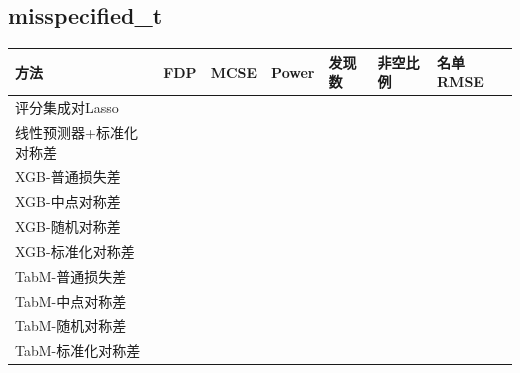 \documentclass[UTF8,11pt,a4paper]{ctexart}
\begin{document}
\subsection{misspecified\_t}\label{misspecified_t}

{\def\LTcaptype{none} %
{
\footnotesize
\begin{longtable}[]{@{}
  >{\raggedright\arraybackslash}p{}
  >{\raggedright\arraybackslash}p{}
  >{\raggedright\arraybackslash}p{}
  >{\raggedright\arraybackslash}p{}
  >{\raggedright\arraybackslash}p{}
  >{\raggedright\arraybackslash}p{}
  >{\raggedright\arraybackslash}p{}@{}}
\toprule\noalign{}
\begin{minipage}[b]{\linewidth}\raggedright
方法
\end{minipage} & \begin{minipage}[b]{\linewidth}\raggedright
FDP
\end{minipage} & \begin{minipage}[b]{\linewidth}\raggedright
MCSE
\end{minipage} & \begin{minipage}[b]{\linewidth}\raggedright
Power
\end{minipage} & \begin{minipage}[b]{\linewidth}\raggedright
发现数
\end{minipage} & \begin{minipage}[b]{\linewidth}\raggedright
非空比例
\end{minipage} & \begin{minipage}[b]{\linewidth}\raggedright
名单RMSE
\end{minipage} \\
\midrule\noalign{}
\endhead
\bottomrule\noalign{}
\endlastfoot
评分集成对Lasso & 0.1546 & 0.0286 & 0.0790 & 2.12 & 0.24 & 1.2047 \\
线性预测器+标准化对称差 & 0.0755 & 0.0208 & 0.0370 & 1.00 & 0.13 & 1.2168 \\
XGB-普通损失差 & 0.0968 & 0.0152 & 0.5060 & 6.36 & 0.69 & 1.0530 \\
XGB-中点对称差 & 0.1382 & 0.0167 & 0.5090 & 6.80 & 0.70 & 1.0509 \\
XGB-随机对称差 & 0.1163 & 0.0154 & 0.4990 & 6.42 & 0.68 & 1.0497 \\
XGB-标准化对称差 & 0.1419 & 0.0189 & 0.3660 & 5.35 & 0.57 & 1.0911 \\
TabM-普通损失差 & 0.1574 & 0.0198 & 0.4060 & 5.63 & 0.69 & 1.0560 \\
TabM-中点对称差 & 0.1390 & 0.0192 & 0.3710 & 5.02 & 0.67 & 1.0655 \\
TabM-随机对称差 & 0.1551 & 0.0202 & 0.3970 & 5.52 & 0.69 & 1.0580 \\
TabM-标准化对称差 & 0.1783 & 0.0228 & 0.2740 & 4.49 & 0.53 & 1.1149 \\
\end{longtable}
}
}
\end{document}
